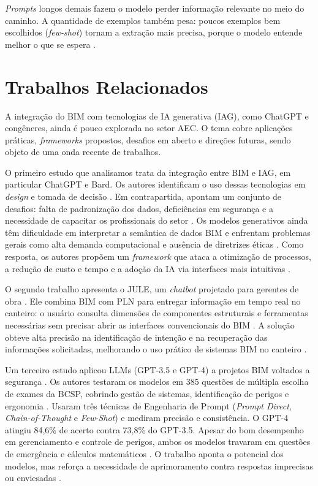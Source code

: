 \textit{Prompts} longos demais fazem o modelo perder informação relevante no meio do caminho. A quantidade de exemplos também pesa: poucos exemplos bem escolhidos (\textit{few-shot}) tornam a extração mais precisa, porque o modelo entende melhor o que se espera \cite{brown2020}.


\section{Trabalhos Relacionados}

A integração do BIM com tecnologias de IA generativa (IAG), como ChatGPT e congêneres, ainda é pouco explorada no setor AEC. O tema cobre aplicações práticas, \textit{frameworks} propostos, desafios em aberto e direções futuras, sendo objeto de uma onda recente de trabalhos.

O primeiro estudo que analisamos trata da integração entre BIM e IAG, em particular ChatGPT e Bard. Os autores identificam o uso dessas tecnologias em \textit{design} e tomada de decisão \cite{rane2023}. Em contrapartida, apontam um conjunto de desafios: falta de padronização dos dados, deficiências em segurança e a necessidade de capacitar os profissionais do setor \cite{rane2023}. Os modelos generativos ainda têm dificuldade em interpretar a semântica de dados BIM e enfrentam problemas gerais como alta demanda computacional e ausência de diretrizes éticas \cite{rane2023}. Como resposta, os autores propõem um \textit{framework} que ataca a otimização de processos, a redução de custo e tempo e a adoção da IA via interfaces mais intuitivas \cite{rane2023}.

O segundo trabalho apresenta o JULE, um \textit{chatbot} projetado para gerentes de obra \cite{lin2023}. Ele combina BIM com PLN para entregar informação em tempo real no canteiro: o usuário consulta dimensões de componentes estruturais e ferramentas necessárias sem precisar abrir as interfaces convencionais do BIM \cite{lin2023}. A solução obteve alta precisão na identificação de intenção e na recuperação das informações solicitadas, melhorando o uso prático de sistemas BIM no canteiro \cite{lin2023}.

Um terceiro estudo aplicou LLMs (GPT-3.5 e GPT-4) a projetos BIM voltados a segurança \cite{sammou2024}. Os autores testaram os modelos em 385 questões de múltipla escolha de exames da BCSP, cobrindo gestão de sistemas, identificação de perigos e ergonomia \cite{sammou2024}. Usaram três técnicas de Engenharia de Prompt (\textit{Prompt Direct}, \textit{Chain-of-Thought} e \textit{Few-Shot}) e mediram precisão e consistência. O GPT-4 atingiu 84,6\% de acerto contra 73,8\% do GPT-3.5. Apesar do bom desempenho em gerenciamento e controle de perigos, ambos os modelos travaram em questões de emergência e cálculos matemáticos \cite{sammou2024}. O trabalho aponta o potencial dos modelos, mas reforça a necessidade de aprimoramento contra respostas imprecisas ou enviesadas \cite{sammou2024}.

